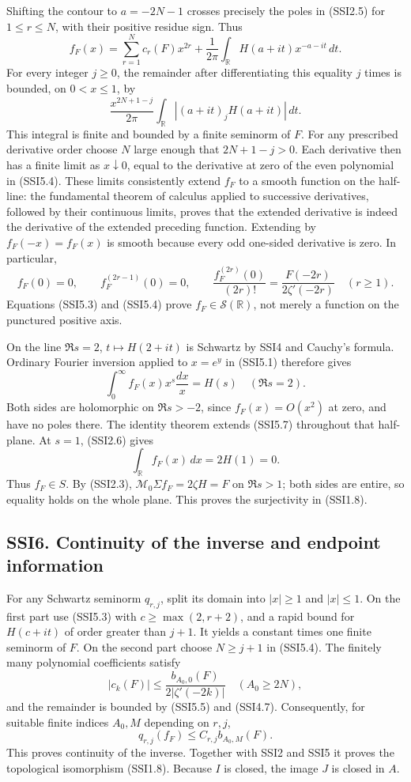 Shifting the contour to \(a=-2N-1\) crosses precisely the poles in
(SSI2.5) for \(1\le r\le N\), with their positive residue sign. Thus \[
f_F(x)=\sum_{r=1}^N c_r(F)x^{2r}
 +\frac1{2\pi}\int_{\mathbb R}H(a+it)x^{-a-it}\,dt.
\tag{SSI5.4}
\] For every integer \(j\ge0\), the remainder after differentiating this
equality \(j\) times is bounded, on \(0<x\le1\), by \[
\frac{x^{2N+1-j}}{2\pi}
\int_{\mathbb R}|(a+it)_jH(a+it)|\,dt.
\tag{SSI5.5}
\] This integral is finite and bounded by a finite seminorm of \(F\).
For any prescribed derivative order choose \(N\) large enough that
\(2N+1-j>0\). Each derivative then has a finite limit as
\(x\downarrow0\), equal to the derivative at zero of the even polynomial
in (SSI5.4). These limits consistently extend \(f_F\) to a smooth
function on the half-line: the fundamental theorem of calculus applied
to successive derivatives, followed by their continuous limits, proves
that the extended derivative is indeed the derivative of the extended
preceding function. Extending by \(f_F(-x)=f_F(x)\) is smooth because
every odd one-sided derivative is zero. In particular, \[
f_F(0)=0,\qquad f_F^{(2r-1)}(0)=0,\qquad
\boxed{\frac{f_F^{(2r)}(0)}{(2r)!}=
 \frac{F(-2r)}{2\zeta'(-2r)}}\quad(r\ge1).
\tag{SSI5.6}
\] Equations (SSI5.3) and (SSI5.4) prove
\(f_F\in\mathcal S(\mathbb R)\), not merely a function on the punctured
positive axis.

On the line \(\Re s=2\), \(t\mapsto H(2+it)\) is Schwartz by SSI4 and
Cauchy's formula. Ordinary Fourier inversion applied to \(x=e^y\) in
(SSI5.1) therefore gives \[
\int_0^\infty f_F(x)x^s\frac{dx}{x}=H(s)
\quad(\Re s=2).
\tag{SSI5.7}
\] Both sides are holomorphic on \(\Re s>-2\), since \(f_F(x)=O(x^2)\)
at zero, and have no poles there. The identity theorem extends (SSI5.7)
throughout that half-plane. At \(s=1\), (SSI2.6) gives \[
\int_{\mathbb R}f_F(x)\,dx=2H(1)=0.
\tag{SSI5.8}
\] Thus \(f_F\in S\). By (SSI2.3), \(\mathcal M_0\Sigma f_F=2\zeta H=F\)
on \(\Re s>1\); both sides are entire, so equality holds on the whole
plane. This proves the surjectivity in (SSI1.8).

\subsection{SSI6. Continuity of the inverse and endpoint
information}\label{ssi6.-continuity-of-the-inverse-and-endpoint-information}

For any Schwartz seminorm \(q_{r,j}\), split its domain into \(|x|\ge1\)
and \(|x|\le1\). On the first part use (SSI5.3) with
\(c\ge\max(2,r+2)\), and a rapid bound for \(H(c+it)\) of order greater
than \(j+1\). It yields a constant times one finite seminorm of \(F\).
On the second part choose \(N\ge j+1\) in (SSI5.4). The finitely many
polynomial coefficients satisfy \[
|c_k(F)|\le\frac{b_{A_0,0}(F)}{2|\zeta'(-2k)|}
\quad(A_0\ge2N),
\tag{SSI6.1}
\] and the remainder is bounded by (SSI5.5) and (SSI4.7). Consequently,
for suitable finite indices \(A_0,M\) depending on \(r,j\), \[
q_{r,j}(f_F)\le C_{r,j} b_{A_0,M}(F).
\tag{SSI6.2}
\] This proves continuity of the inverse. Together with SSI2 and SSI5 it
proves the topological isomorphism (SSI1.8). Because \(I\) is closed,
the image \(J\) is closed in \(A\).

